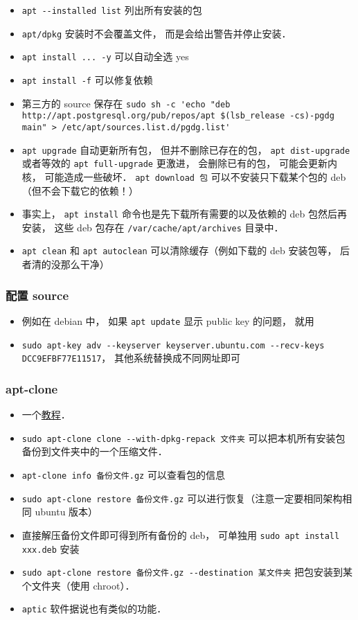 \begin{itemize}
\item \verb|apt --installed list| 列出所有安装的包
\item \verb|apt/dpkg| 安装时不会覆盖文件， 而是会给出警告并停止安装．
\item \verb|apt install ... -y| 可以自动全选 yes
\item \verb|apt install -f| 可以修复依赖
\item 第三方的 source 保存在 \verb|sudo sh -c 'echo "deb http://apt.postgresql.org/pub/repos/apt $(lsb_release -cs)-pgdg main" > /etc/apt/sources.list.d/pgdg.list'|
\item \verb|apt upgrade| 自动更新所有包， 但并不删除已存在的包， \verb|apt dist-upgrade| 或者等效的 \verb|apt full-upgrade| 更激进， 会删除已有的包， 可能会更新内核， 可能造成一些破坏．
\verb|apt download 包| 可以不安装只下载某个包的 deb （但不会下载它的依赖！）
\item 事实上， \verb|apt install| 命令也是先下载所有需要的以及依赖的 deb 包然后再安装， 这些 deb 包存在 \verb|/var/cache/apt/archives| 目录中．
\item \verb|apt clean| 和 \verb|apt autoclean| 可以清除缓存（例如下载的 deb 安装包等， 后者清的没那么干净）
\end{itemize}


\subsubsection{配置 source}
\begin{itemize}
\item 例如在 debian 中， 如果 \verb|apt update| 显示 public key 的问题， 就用
\item \verb|sudo apt-key adv --keyserver keyserver.ubuntu.com --recv-keys DCC9EFBF77E11517|， 其他系统替换成不同网址即可
\end{itemize}

\subsubsection{apt-clone}
\begin{itemize}
\item 一个\href{https://ubunlog.com/en/apt-clone-copia-seguridad-paquetes/}{教程}．
\item \verb|sudo apt-clone clone --with-dpkg-repack 文件夹| 可以把本机所有安装包备份到文件夹中的一个压缩文件．
\item \verb|apt-clone info 备份文件.gz| 可以查看包的信息
\item \verb|sudo apt-clone restore 备份文件.gz| 可以进行恢复（注意一定要相同架构相同 ubuntu 版本）
\item 直接解压备份文件即可得到所有备份的 deb， 可单独用 \verb|sudo apt install xxx.deb| 安装
\item \verb|sudo apt-clone restore 备份文件.gz --destination 某文件夹| 把包安装到某个文件夹（使用 chroot）．
\item \verb|aptic| 软件据说也有类似的功能．
\end{itemize}



